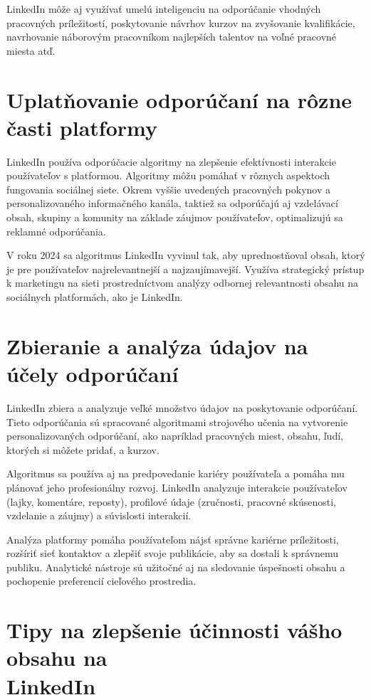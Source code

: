 \documentclass[slovak,a4paper]{coursepaper}
\begin{document}
LinkedIn môže aj využívať umelú inteligenciu na odporúčanie vhodných pracovných príležitostí, poskytovanie návrhov kurzov na zvyšovanie kvalifikácie, navrhovanie náborovým pracovníkom najlepších talentov na voľné pracovné miesta atď.~\cite{8}

\section{Uplatňovanie odporúčaní na rôzne časti platformy} \label{Uplatňovanie}
LinkedIn používa odporúčacie algoritmy na zlepšenie efektívnosti interakcie používateľov s platformou.
Algoritmy môžu pomáhať v rôznych aspektoch fungovania sociálnej siete.
Okrem vyššie uvedených pracovných pokynov a personalizovaného informačného kanála, taktiež sa odporúčajú aj vzdelávací obsah, skupiny a komunity na základe záujmov používateľov, optimalizujú sa reklamné odporúčania.

V roku 2024 sa algoritmus LinkedIn vyvinul tak, aby uprednostňoval obsah, ktorý je pre používateľov najrelevantnejší a najzaujímavejší.
Využíva strategický prístup k marketingu na sieti prostredníctvom analýzy odbornej relevantnosti obsahu na sociálnych platformách, ako je LinkedIn.~\cite{9}


\section{Zbieranie a analýza údajov na účely odporúčaní} \label{analýza údajov}
LinkedIn zbiera a analyzuje veľké množstvo údajov na poskytovanie odporúčaní. Tieto odporúčania sú spracované algoritmami strojového učenia na vytvorenie personalizovaných odporúčaní, ako napríklad pracovných miest, obsahu, ľudí, ktorých si môžete pridať, a kurzov.

Algoritmus sa používa aj na predpovedanie kariéry používateľa a pomáha mu plánovať jeho profesionálny rozvoj. LinkedIn analyzuje interakcie používateľov (lajky, komentáre, reposty), profilové údaje (zručnosti, pracovné skúsenosti, vzdelanie a záujmy) a súvislosti interakcií.~\cite{10}

Analýza platformy pomáha používateľom nájsť správne kariérne príležitosti, rozšíriť sieť kontaktov a zlepšiť svoje publikácie, aby sa dostali k správnemu publiku. Analytické nástroje sú užitočné aj na sledovanie úspešnosti obsahu a pochopenie preferencií cieľového prostredia.

\section{\texorpdfstring{Tipy na zlepšenie účinnosti vášho obsahu na \\ LinkedIn}{Tipy na zlepšenie účinnosti vášho obsahu na LinkedIn}}
\label{Tipy}
\end{document}
